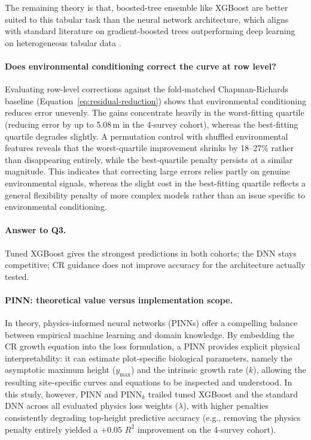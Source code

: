 \documentclass[logo,msc,ai]{infthesis}           %
\begin{document}
The remaining theory is that, boosted-tree ensemble like XGBoost are better suited to this tabular task than the neural network architecture, which aligns with standard literature on gradient-boosted trees outperforming deep learning on heterogeneous tabular data \cite{shwartzziv2021Tabular_C4_NN}.

\paragraph*{Does environmental conditioning correct the curve at row level?}
Evaluating row-level corrections against the fold-matched Chapman-Richards baseline (Equation~\ref{eq:residual-reduction}) shows that environmental conditioning reduces error unevenly. The gains concentrate heavily in the worst-fitting quartile (reducing error by up to 5.08\,m in the 4-survey cohort), whereas the best-fitting quartile degrades slightly. A permutation control with shuffled environmental features reveals that the worst-quartile improvement shrinks by 18--27\% rather than disappearing entirely, while the best-quartile penalty persists at a similar magnitude. This indicates that correcting large errors relies partly on genuine environmental signals, whereas the slight cost in the best-fitting quartile reflects a general flexibility penalty of more complex models rather than an issue specific to environmental conditioning.

\paragraph*{Answer to Q3.} Tuned XGBoost gives the strongest predictions in both cohorts; the DNN stays competitive; CR guidance does not improve accuracy for the architecture actually tested.

\paragraph*{PINN: theoretical value versus implementation scope.}
\label{sec:rq1-pinn-limitation}
In theory, physics-informed neural networks (PINNs) offer a compelling balance between empirical machine learning and domain knowledge. By embedding the CR growth equation into the loss formulation, a PINN provides explicit physical interpretability: it can estimate plot-specific biological parameters, namely the asymptotic maximum height ($y_{\max}$) and the intrinsic growth rate ($k$), allowing the resulting site-specific curves and equations to be inspected and understood. In this study, however, PINN and $\text{PINN}_k$ trailed tuned XGBoost and the standard DNN across all evaluated physics loss weights ($\lambda$), with higher penalties consistently degrading top-height predictive accuracy (e.g., removing the physics penalty entirely yielded a $+0.05$ $R^2$ improvement on the 4-survey cohort).
\end{document}
